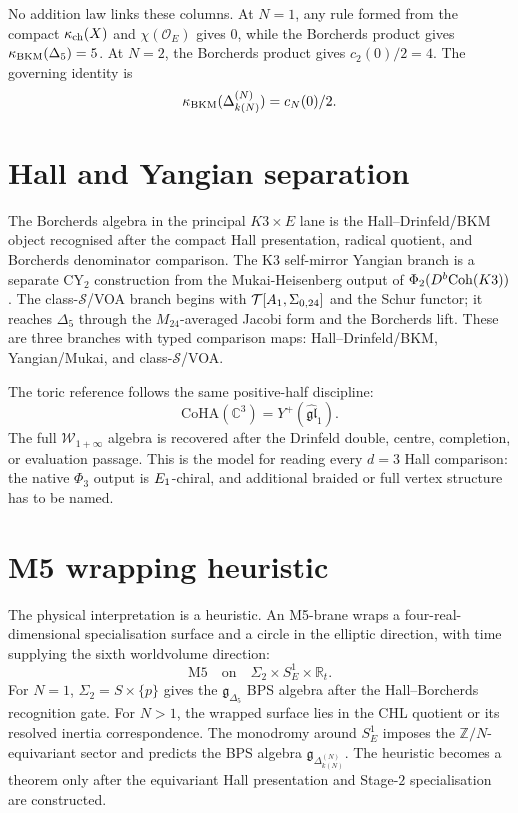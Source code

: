 No addition law links these columns.  At \(N=1\), any rule formed from
the compact \(\kappa_{\mathrm{ch}}(X)\) and \(\chi(\mathcal O_E)\) gives \(0\), while
the Borcherds product gives \(\kappa_{\mathrm{BKM}}(\Delta_5)=5\).  At \(N=2\), the
Borcherds product gives \(c_2(0)/2=4\).  The governing identity is
\[
 \kappa_{\mathrm{BKM}}(\Delta_{k(N)}^{(N)})=c_N(0)/2.
\]

\section*{Hall and Yangian separation}
\label{wn:sec:hall-yangian-separation}

The Borcherds algebra in the principal \(K3\times E\) lane is the
Hall--Drinfeld/BKM object recognised after the compact Hall
presentation, radical quotient, and Borcherds denominator comparison.
The K3 self-mirror Yangian branch is a separate CY\(_2\) construction
from the Mukai-Heisenberg output of \(\Phi_2(D^b\mathrm{Coh}(K3))\).
The class-\(\mathcal S\)/VOA branch begins with
\(\mathcal T[A_1,\Sigma_{0,24}]\) and the Schur functor; it reaches
\(\Delta_5\) through the \(M_{24}\)-averaged Jacobi form and the
Borcherds lift.  These are three branches with typed comparison maps:
Hall--Drinfeld/BKM, Yangian/Mukai, and class-\(\mathcal S\)/VOA.

The toric reference follows the same positive-half discipline:
\[
 \mathrm{CoHA}(\mathbb C^3)=Y^+(\widehat{\mathfrak{gl}}_1).
\]
The full \(\mathcal W_{1+\infty}\) algebra is recovered after the
Drinfeld double, centre, completion, or evaluation passage.  This is
the model for reading every \(d=3\) Hall comparison: the native
\(\Phi_3\) output is \(E_1\)-chiral, and additional braided or full
vertex structure has to be named.

\section*{M5 wrapping heuristic}
\label{wn:sec:m5-wrapping}

The physical interpretation is a heuristic.  An M5-brane wraps a
four-real-dimensional specialisation surface and a circle in the
elliptic direction, with time supplying the sixth worldvolume
direction:
\[
 \mathrm{M5}\quad\text{on}\quad \Sigma_2\times S^1_E\times \mathbb R_t.
\]
For \(N=1\), \(\Sigma_2=S\times\{p\}\) gives the
\(\mathfrak g_{\Delta_5}\) BPS algebra after the Hall--Borcherds
recognition gate.  For \(N>1\), the wrapped surface lies in the CHL
quotient or its resolved inertia correspondence.  The monodromy around
\(S^1_E\) imposes the \(\mathbb Z/N\)-equivariant sector and predicts
the BPS algebra \(\mathfrak g_{\Delta_{k(N)}^{(N)}}\).  The heuristic
becomes a theorem only after the equivariant Hall presentation and
Stage-\(2\) specialisation are constructed.

